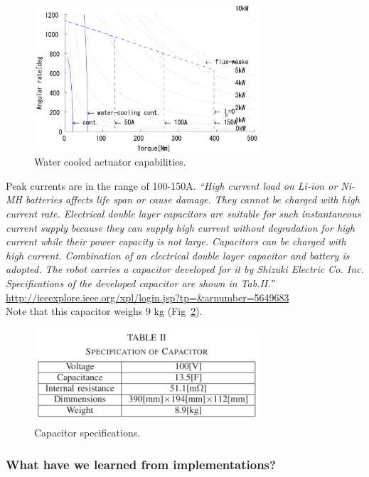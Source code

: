 \documentclass[letterpaper,12pt,fullpage]{article}
\begin{document}
\begin{figure}[t]
\centering
\includegraphics[width=0.75\textwidth]{tech-figs/s1}
\caption{Water cooled actuator capabilities.}
\label{f:s1}
\end{figure}

Peak currents are in the range of 100-150A.
{\it
``High current load on Li-ion or Ni-MH batteries affects life
span or cause damage. They cannot be charged with high
current rate. Electrical double layer capacitors are suitable for
such instantaneous current supply because they can supply
high current without degradation for high current while
their power capacity is not large. Capacitors can be charged
with high current. Combination of an electrical double layer
capacitor and battery is adopted. The robot carries a capacitor
developed for it by Shizuki Electric Co. Inc. Specifications of
the developed capacitor are shown in Tab.II.''}\\
\url{http://ieeexplore.ieee.org/xpl/login.jsp?tp=&arnumber=5649683}\\
Note that this capacitor weighs 9 kg (Fig~\ref{f:s2}).

\begin{figure}[h]
\centering
\includegraphics[width=0.75\textwidth]{tech-figs/s2}
\caption{Capacitor specifications.}
\label{f:s2}
\end{figure}

\subsubsection{What have we learned from implementations?}
\end{document}
